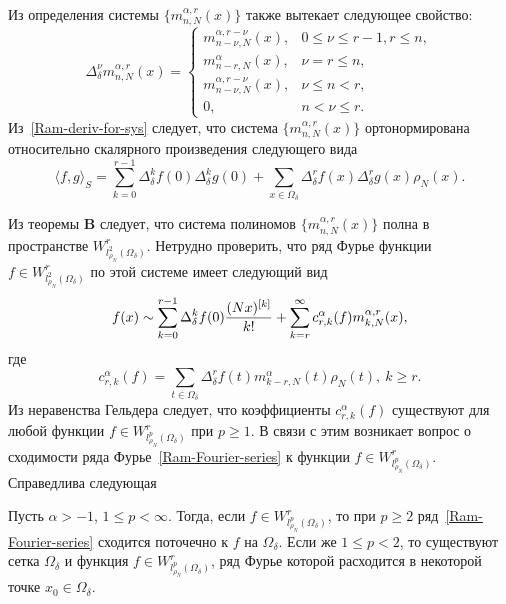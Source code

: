 Из определения системы $\{m_{n,N}^{\alpha,r}(x)\}$ также вытекает следующее свойство:
\begin{equation}\label{Ram-deriv-for-sys}
\Delta_\delta^\nu m_{n,N}^{\alpha,r}(x)=
\begin{cases}
m_{n-\nu,N}^{\alpha,r-\nu}(x),& 0\le\nu\le r-1, r\le n,\\
m_{n-r,N}^{\alpha}(x),& \nu=r\le n,\\
m_{n-\nu,N}^{\alpha,r-\nu}(x),& \nu\le n<r,\\
0,& n<\nu\le r.
\end{cases}
\end{equation}
Из~\eqref{Ram-deriv-for-sys} следует, что система $\{m_{n,N}^{\alpha,r}(x)\}$ ортонормирована относительно скалярного произведения следующего вида
\begin{equation*}
\langle f,g\rangle_S=\sum_{k=0}^{r-1}\Delta_\delta^kf(0)\Delta_\delta^kg(0)+\sum_{x\in\Omega_\delta}\Delta_\delta^rf(x)\Delta_\delta^rg(x)\rho_N(x).
\end{equation*}

Из теоремы \textbf{B} следует, что система полиномов $\{m_{n,N}^{\alpha,r}(x)\}$ полна в пространстве $W^r_{l^2_{\rho_N}(\Omega_\delta)}$. Нетрудно проверить, что ряд Фурье функции $f\in W^r_{l^2_{\rho_N}(\Omega_\delta)}$ по этой системе имеет следующий вид
\begin{equation}\label{Ram-Fourier-series}
f(x)\sim \sum_{k=0}^{r-1}\Delta_\delta^kf(0){(Nx)^{[k]}\over k!}+\sum_{k=r}^\infty c^\alpha_{r,k}(f)m^{\alpha,r}_{k,N}(x),
\end{equation}
где
\begin{equation*}
c^\alpha_{r,k}(f)=\sum_{t\in\Omega_\delta}\Delta_\delta^r f(t)m^\alpha_{k-r,N}(t)\rho_N(t),\ k\ge r.
\end{equation*}
Из неравенства Гельдера следует, что коэффициенты $c^\alpha_{r,k}(f)$ существуют для любой функции $f\in W^r_{l^p_{\rho_N}(\Omega_\delta)}$ при $p\ge 1$. В связи с этим возникает вопрос о сходимости ряда Фурье~\eqref{Ram-Fourier-series} к функции $f\in W^r_{l^p_{\rho_N}(\Omega_\delta)}$. Справедлива следующая
\begin{theorem}\label{Ram-theoMex1}
Пусть $\alpha>-1$, $1\le p<\infty$. Тогда, если $f\in W^r_{l^p_{\rho_N}(\Omega_\delta)}$, то при $p\ge2$ ряд~\eqref{Ram-Fourier-series} сходится поточечно к $f$ на $\Omega_\delta$. Если же $1\le p<2$, то существуют сетка $\Omega_\delta$ и функция $f\in W^r_{l^p_{\rho_N}(\Omega_\delta)}$, ряд Фурье которой расходится в некоторой точке $x_0\in \Omega_\delta$.
\end{theorem}

